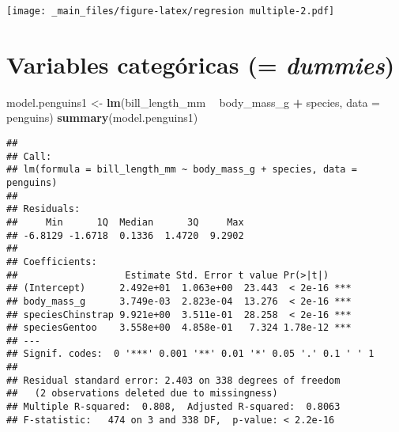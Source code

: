 \documentclass[
]{book}
\newenvironment{Shaded}{\begin{snugshade}}{\end{snugshade}}
\newcommand{\DataTypeTok}[1]{\textcolor[rgb]{0.13,0.29,0.53}{#1}}
\newcommand{\DecValTok}[1]{\textcolor[rgb]{0.00,0.00,0.81}{#1}}
\newcommand{\KeywordTok}[1]{\textcolor[rgb]{0.13,0.29,0.53}{\textbf{#1}}}
\newcommand{\NormalTok}[1]{#1}
\newcommand{\OperatorTok}[1]{\textcolor[rgb]{0.81,0.36,0.00}{\textbf{#1}}}
\newcommand{\OtherTok}[1]{\textcolor[rgb]{0.56,0.35,0.01}{#1}}
\newcommand{\StringTok}[1]{\textcolor[rgb]{0.31,0.60,0.02}{#1}}
\begin{document}
\begin{Shaded}
\end{Shaded}

\texttt{[image: \_main\_files/figure-latex/regresion multiple-2.pdf]}

\hypertarget{variables-categuxf3ricas-dummies}{%
\section{\texorpdfstring{Variables categóricas (= \emph{dummies})}{Variables categóricas (= dummies)}}\label{variables-categuxf3ricas-dummies}}

\begin{Shaded}
\begin{Highlighting}[]
\NormalTok{model.penguins1 <-}\StringTok{ }\KeywordTok{lm}\NormalTok{(bill_length_mm }\OperatorTok{~}\StringTok{ }\NormalTok{body_mass_g }\OperatorTok{+}\StringTok{ }\NormalTok{species, }\DataTypeTok{data =}\NormalTok{ penguins)}
\KeywordTok{summary}\NormalTok{(model.penguins1)}
\end{Highlighting}
\end{Shaded}

\begin{verbatim}
## 
## Call:
## lm(formula = bill_length_mm ~ body_mass_g + species, data = penguins)
## 
## Residuals:
##     Min      1Q  Median      3Q     Max 
## -6.8129 -1.6718  0.1336  1.4720  9.2902 
## 
## Coefficients:
##                   Estimate Std. Error t value Pr(>|t|)    
## (Intercept)      2.492e+01  1.063e+00  23.443  < 2e-16 ***
## body_mass_g      3.749e-03  2.823e-04  13.276  < 2e-16 ***
## speciesChinstrap 9.921e+00  3.511e-01  28.258  < 2e-16 ***
## speciesGentoo    3.558e+00  4.858e-01   7.324 1.78e-12 ***
## ---
## Signif. codes:  0 '***' 0.001 '**' 0.01 '*' 0.05 '.' 0.1 ' ' 1
## 
## Residual standard error: 2.403 on 338 degrees of freedom
##   (2 observations deleted due to missingness)
## Multiple R-squared:  0.808,  Adjusted R-squared:  0.8063 
## F-statistic:   474 on 3 and 338 DF,  p-value: < 2.2e-16
\end{verbatim}
\end{document}
